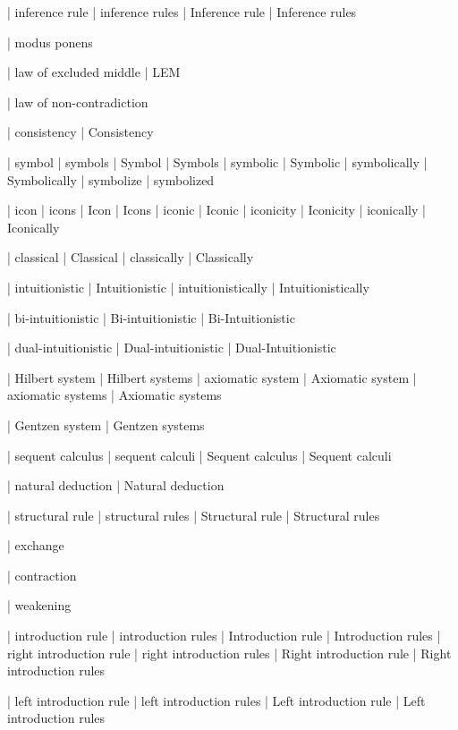  | inference rule
 | inference rules
 | Inference rule
 | Inference rules

 | modus ponens

 | law of excluded middle
 | LEM

 | law of non-contradiction

 | consistency
 | Consistency

 | symbol
 | symbols
 | Symbol
 | Symbols
 | symbolic
 | Symbolic
 | symbolically
 | Symbolically
 | symbolize
 | symbolized

 | icon
 | icons
 | Icon
 | Icons
 | iconic
 | Iconic
 | iconicity
 | Iconicity
 | iconically
 | Iconically
 
 | classical
 | Classical
 | classically
 | Classically

 | intuitionistic
 | Intuitionistic
 | intuitionistically
 | Intuitionistically

 | bi-intuitionistic
 | Bi-intuitionistic
 | Bi-Intuitionistic

 | dual-intuitionistic
 | Dual-intuitionistic
 | Dual-Intuitionistic

 | Hilbert system
 | Hilbert systems
 | axiomatic system
 | Axiomatic system
 | axiomatic systems
 | Axiomatic systems

 | Gentzen system
 | Gentzen systems

 | sequent calculus
 | sequent calculi
 | Sequent calculus
 | Sequent calculi

 | natural deduction
 | Natural deduction

 | structural rule
 | structural rules
 | Structural rule
 | Structural rules

 | exchange

 | contraction

 | weakening

 | introduction rule
 | introduction rules
 | Introduction rule
 | Introduction rules
 | right introduction rule
 | right introduction rules
 | Right introduction rule
 | Right introduction rules

 | left introduction rule
 | left introduction rules
 | Left introduction rule
 | Left introduction rules

